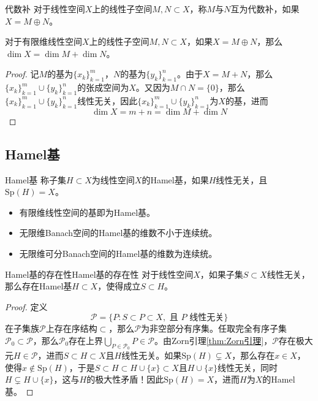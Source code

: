 \documentclass[lang = cn, scheme = chinese, thmcnt = section]{elegantbook}
\newcommand{\sub}{\subset}             %
\begin{document}
\begin{definition}{代数补}
	对于线性空间$X$上的线性子空间$M,N\sub X$，称$M$与$N$互为代数补，如果$X=M\oplus N$。
\end{definition}

\begin{theorem}
	对于有限维线性空间$X$上的线性子空间$M,N\sub X$，如果$X=M\oplus N$，那么$\dim X=\dim M+\dim N$。
\end{theorem}

\begin{proof}
	记$M$的基为$\{ x_k \}_{k=1}^{m}$，$N$的基为$\{ y_k \}_{k=1}^{n}$。由于$X=M+N$，那么$\{ x_k \}_{k=1}^{m}\cup \{ y_k \}_{k=1}^{n}$的张成空间为$X$。又因为$M\cap N=\{0\}$，那么$\{ x_k \}_{k=1}^{m}\cup \{ y_k \}_{k=1}^{n}$线性无关，因此$\{ x_k \}_{k=1}^{m}\cup \{ y_k \}_{k=1}^{n}$为$X$的基，进而
	$$
	\dim X=m+n=\dim M+\dim N
	$$
\end{proof}

\subsection{Hamel基}

\begin{definition}{Hamel基}
	称子集$H\sub X$为线性空间$X$的Hamel基，如果$H$线性无关，且$\mathrm{Sp}(H)=X$。
\end{definition}

\begin{note}
	\begin{itemize}
		\item 有限维线性空间的基即为Hamel基。
		\item 无限维Banach空间的Hamel基的维数不小于连续统。
		\item 无限维可分Banach空间的Hamel基的维数为连续统。
	\end{itemize}
\end{note}

\begin{theorem}{Hamel基的存在性}{Hamel基的存在性}
	对于线性空间$X$，如果子集$S\sub X$线性无关，那么存在Hamel基$H\sub X$，使得成立$S\sub H$。
\end{theorem}

\begin{proof}
	定义
	$$
	\mathscr{P}=\{ P:S\sub P\sub X, \text{ 且 } P \text{ 线性无关} \}
	$$
	在子集族$\mathscr{P}$上存在序结构$\sub$，那么$\mathscr{P}$为非空部分有序集。任取完全有序子集$\mathscr{P}_0\sub \mathscr{P}$，那么$\mathscr{P}_0$存在上界$\displaystyle\bigcup_{P\in\mathscr{P}_0}P\in\mathscr{P}$。由Zorn引理\ref{thm:Zorn引理}，$\mathscr{P}$存在极大元$H\in\mathscr{P}$，进而$S\sub H\sub X$且$H$线性无关。如果$\mathrm{Sp}(H)\subsetneq X$，那么存在$x\in X$，使得$x\notin \mathrm{Sp}(H)$，于是$S\sub H\sub H\cup\{x\}\sub X$且$H\cup\{x\}$线性无关，同时$H\subsetneq H\cup\{x\}$，这与$H$的极大性矛盾！因此$\mathrm{Sp}(H)=X$，进而$H$为$X$的Hamel基。
\end{proof}
\end{document}
